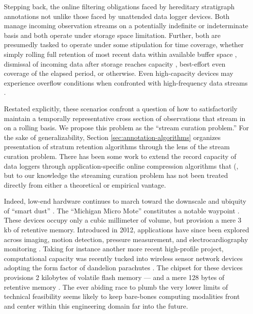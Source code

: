 Stepping back, the online filtering obligations faced by hereditary stratigraph annotations not unlike those faced by unattended data logger devices.
Both manage incoming observation streams on a potentially indefinite or indeterminate basis and both operate under storage space limitation.
Further, both are presumedly tasked to operate under some stipulation for time coverage, whether simply rolling full retention of most recent data within available buffer space \citep{fincham1995use}, dismissal of incoming data after storage reaches capacity \citep{saunders1989portable,mahzan2017design}, best-effort even coverage of the elapsed period, or otherwise.
Even high-capacity devices may experience overflow conditions when confronted with high-frequency data streams \citep{luharuka2003design}.

Restated explicitly, these scenarios confront a question of how to satisfactorily maintain a temporally representative cross section of observations that stream in on a rolling basis.
We propose this problem as the ``stream curation problem.''
For the sake of generalizability, Section \ref{sec:annotation-algorithms} organizes presentation of stratum retention algorithms through the lens of the stream curation problem.
There has been some work to extend the record capacity of data loggers through application-specific online compression algorithms that (\citep{hadiatna2016design}, but to our knowledge the streaming curation problem has not been treated directly from either a theoretical or empirical vantage.

Indeed, low-end hardware continues to march toward the downscale and ubiquity of ``smart dust'' \citep{warneke2001smart}.
The ``Michigan Micro Mote'' constitutes a notable waypoint \citep{lee2012modular}.
These devices occupy only a cubic millimeter of volume, but provision a mere 3 kb of retentive memory.
Introduced in 2012, applications have since been explored across imaging, motion detection, pressure measurement, and electrocardiography monitoring \citep{lee2015review}.
Taking for instance another more recent high-profile project, computational capacity was recently tucked into wireless sensor network devices adopting the form factor of dandelion parachutes \citep{iyer2022wind}.
The chipset for these devices provisions 2 kilobytes of volatile flash memory --- and a mere 128 bytes of retentive memory \citep{microchip2014atiny20}.
The ever abiding race to plumb the very lower limits of technical feasibility seems likely to keep bare-bones computing modalities front and center within this engineering domain far into the future.

